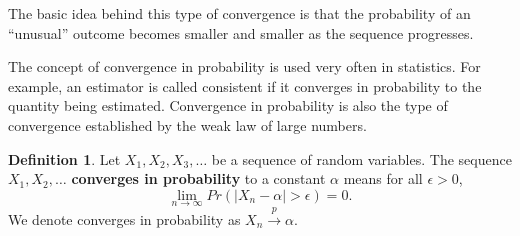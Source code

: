 \documentclass[11pt,a4paper]{amsart}
\theoremstyle{plain}
\theoremstyle{definition}
\newtheorem{definition}{Definition}
\begin{document}
	The basic idea behind this type of convergence is that the probability of an “unusual” outcome becomes smaller and smaller as the sequence progresses.\par 
	The concept of convergence in probability is used very often in statistics. For example, an estimator is called consistent if it converges in probability to the quantity being estimated. Convergence in probability is also the type of convergence established by the weak law of large numbers.
	\begin{definition}
		Let $X_{1}, X_{2}, X_{3}, \dots$ be a sequence of random variables. The sequence $X_{1}, X_{2}, \dots$ \textbf{converges in probability} to a constant $\alpha$ means for all $\epsilon > 0$, 
		\[	\lim_{n \to \infty} Pr(|X_{n} - \alpha| > \epsilon) = 0.	\]
		We denote converges in probability as $X_{n} \xrightarrow{p} \alpha$.
	\end{definition}
\end{document}
